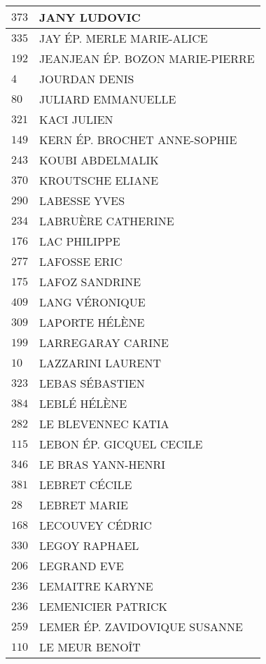 \begin{xltabular}{\linewidth}{|l|X|}
    \hline
    $373$ & JANY LUDOVIC \\
    \hline
    $335$ & JAY ÉP. MERLE MARIE-ALICE \\
    \hline
    $192$ & JEANJEAN ÉP. BOZON MARIE-PIERRE \\
    \hline
    $4$ & JOURDAN DENIS \\
    \hline
    $80$ & JULIARD EMMANUELLE \\
    \hline
    $321$ & KACI JULIEN \\
    \hline
    $149$ & KERN ÉP. BROCHET ANNE-SOPHIE \\
    \hline
    $243$ & KOUBI ABDELMALIK \\
    \hline
    $370$ & KROUTSCHE ELIANE \\
    \hline
    $290$ & LABESSE YVES \\
    \hline
    $234$ & LABRUÈRE CATHERINE \\
    \hline
    $176$ & LAC PHILIPPE \\
    \hline
    $277$ & LAFOSSE ERIC \\
    \hline
    $175$ & LAFOZ SANDRINE \\
    \hline
    $409$ & LANG VÉRONIQUE \\
    \hline
    $309$ & LAPORTE HÉLÈNE \\
    \hline
    $199$ & LARREGARAY CARINE \\
    \hline
    $10$ & LAZZARINI LAURENT \\
    \hline
    $323$ & LEBAS SÉBASTIEN \\
    \hline
    $384$ & LEBLÉ HÉLÈNE \\
    \hline
    $282$ & LE BLEVENNEC KATIA \\
    \hline
    $115$ & LEBON ÉP. GICQUEL CECILE \\
    \hline
    $346$ & LE BRAS YANN-HENRI \\
    \hline
    $381$ & LEBRET CÉCILE \\
    \hline
    $28$ & LEBRET MARIE \\
    \hline
    $168$ & LECOUVEY CÉDRIC \\
    \hline
    $330$ & LEGOY RAPHAEL \\
    \hline
    $206$ & LEGRAND EVE \\
    \hline
    $236$ & LEMAITRE KARYNE \\
    \hline
    $236$ & LEMENICIER PATRICK \\
    \hline
    $259$ & LEMER ÉP. ZAVIDOVIQUE SUSANNE \\
    \hline
    $110$ & LE MEUR BENOÎT \\

\end{xltabular}
